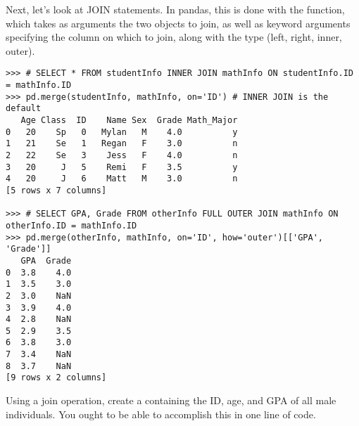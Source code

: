 Next, let's look at JOIN statements.
In pandas, this is done with the  function,
which takes as arguments the two  objects to join, as well as keyword arguments specifying
the column on which to join, along with the type (left, right, inner, outer).

\begin{lstlisting}
>>> # SELECT * FROM studentInfo INNER JOIN mathInfo ON studentInfo.ID = mathInfo.ID
>>> pd.merge(studentInfo, mathInfo, on='ID') # INNER JOIN is the default
   Age Class  ID    Name Sex  Grade Math_Major
0   20    Sp   0   Mylan   M    4.0          y
1   21    Se   1   Regan   F    3.0          n
2   22    Se   3    Jess   F    4.0          n
3   20     J   5    Remi   F    3.5          y
4   20     J   6    Matt   M    3.0          n
[5 rows x 7 columns]

>>> # SELECT GPA, Grade FROM otherInfo FULL OUTER JOIN mathInfo ON otherInfo.ID = mathInfo.ID
>>> pd.merge(otherInfo, mathInfo, on='ID', how='outer')[['GPA', 'Grade']]
   GPA  Grade
0  3.8    4.0
1  3.5    3.0
2  3.0    NaN
3  3.9    4.0
4  2.8    NaN
5  2.9    3.5
6  3.8    3.0
7  3.4    NaN
8  3.7    NaN
[9 rows x 2 columns]
\end{lstlisting}

\begin{problem}
Using a join operation, create a  containing the ID, age, and GPA of all male individuals.
You ought to be able to accomplish this in one line of code.
\end{problem}

